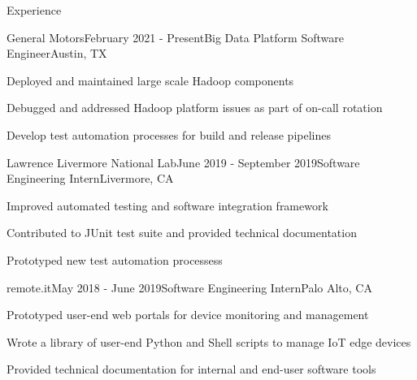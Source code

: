 \documentclass{resume} %
\begin{document}

\begin{rSection}{Experience}
    \begin{rSubsection}{General Motors}{February 2021 - Present}{Big Data Platform Software Engineer}{Austin, TX}
        \item Deployed and maintained large scale Hadoop components
        \item Debugged and addressed Hadoop platform issues as part of on-call rotation
        \item Develop test automation processes for build and release pipelines
    \end{rSubsection}

    \begin{rSubsection}{Lawrence Livermore National Lab}{June 2019 - September 2019}{Software Engineering Intern}{Livermore, CA}
        \item Improved automated testing and software integration framework
        \item Contributed to JUnit test suite and provided technical documentation
        \item Prototyped new test automation processess 
    \end{rSubsection}

    \begin{rSubsection}{remote.it}{May 2018 - June 2019}{Software Engineering Intern}{Palo Alto, CA}
        \item Prototyped user-end web portals for device monitoring and management
        \item Wrote a library of user-end Python and Shell scripts to manage IoT edge devices
        \item Provided technical documentation for internal and end-user software tools
    \end{rSubsection}

\end{rSection}

\end{document}
